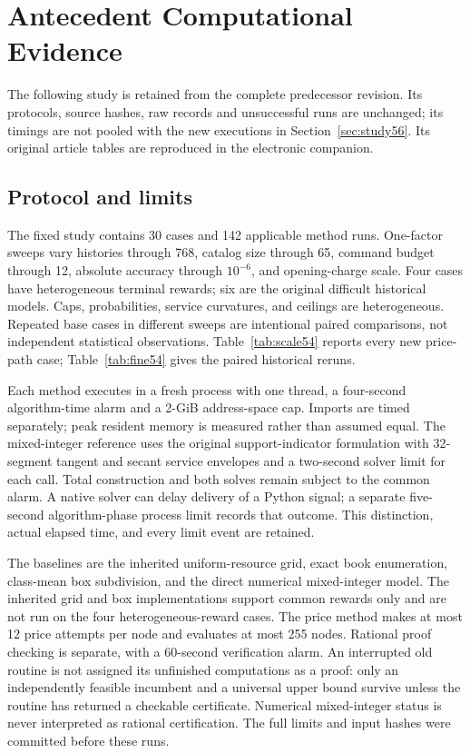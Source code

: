 \section{Antecedent Computational Evidence}\label{sec:study54}
The following study is retained from the complete predecessor revision. Its protocols, source hashes, raw records and unsuccessful runs are unchanged; its timings are not pooled with the new executions in Section~\ref{sec:study56}. Its original article tables are reproduced in the electronic companion.

\subsection{Protocol and limits}
The fixed study contains 30 cases and 142 applicable method runs. One-factor sweeps vary histories through 768, catalog size through 65, command budget through 12, absolute accuracy through $10^{-6}$, and opening-charge scale. Four cases have heterogeneous terminal rewards; six are the original difficult historical models. Caps, probabilities, service curvatures, and ceilings are heterogeneous. Repeated base cases in different sweeps are intentional paired comparisons, not independent statistical observations. Table~\ref{tab:scale54} reports every new price-path case; Table~\ref{tab:fine54} gives the paired historical reruns.

Each method executes in a fresh process with one thread, a four-second algorithm-time alarm and a 2-GiB address-space cap. Imports are timed separately; peak resident memory is measured rather than assumed equal. The mixed-integer reference uses the original support-indicator formulation with 32-segment tangent and secant service envelopes and a two-second solver limit for each call. Total construction and both solves remain subject to the common alarm. A native solver can delay delivery of a Python signal; a separate five-second algorithm-phase process limit records that outcome. This distinction, actual elapsed time, and every limit event are retained.

The baselines are the inherited uniform-resource grid, exact book enumeration, class-mean box subdivision, and the direct numerical mixed-integer model. The inherited grid and box implementations support common rewards only and are not run on the four heterogeneous-reward cases. The price method makes at most 12 price attempts per node and evaluates at most 255 nodes. Rational proof checking is separate, with a 60-second verification alarm. An interrupted old routine is not assigned its unfinished computations as a proof: only an independently feasible incumbent and a universal upper bound survive unless the routine has returned a checkable certificate. Numerical mixed-integer status is never interpreted as rational certification. The full limits and input hashes were committed before these runs.


